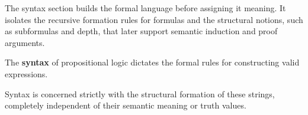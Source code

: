 \begin{remark*}[Exposition]
The syntax section builds the formal language before assigning it meaning.
It isolates the recursive formation rules for formulas and the structural
notions, such as subformulas and depth, that later support semantic induction
and proof arguments.
\end{remark*}
\begin{definition}
The \textbf{syntax} of propositional logic dictates the formal rules for constructing valid expressions.

Syntax is concerned strictly with the structural formation of these strings, completely independent of their semantic meaning or truth values.
\end{definition}

